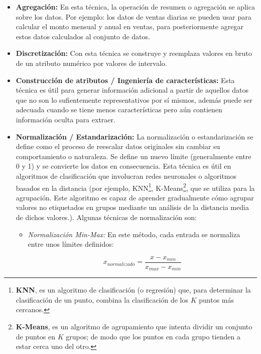 \begin{itemize}
\item \textbf{Agregaci\'{o}n: }En esta t\'{e}cnica, la operaci\'{o}n de resumen o agregaci\'{o}n se aplica sobre los datos. Por ejemplo: los datos de ventas diarias se pueden usar para calcular el monto mensual y anual en ventas, para posteriormente agregar estos datos calculados al conjunto de datos.

\item \textbf{Discretizaci\'{o}n: }Con esta t\'{e}cnica se construye y reemplaza valores en bruto de un atributo num\'{e}rico por valores de intervalo.

\item \textbf{Construcci\'{o}n de atributos / Ingenier\'{i}a de caracter\'{i}sticas: }Esta t\'{e}cnica es \'{u}til para generar informaci\'{o}n adicional a partir de aquellos datos que no son lo sufientemente representativos por s\'{i} mismos, adem\'{a}s puede ser adecuada cuando se tiene menos caracter\'{i}sticas pero a\'{u}n contienen informaci\'{o}n oculta para extraer.

\item \textbf{Normalizaci\'{o}n / Estandarizaci\'{o}n: }La normalizaci\'{o}n o estandarizaci\'{o}n se define como el proceso de reescalar datos originales sin cambiar su comportamiento o naturaleza. Se define un nuevo l\'{i}mite (generalmente entre 0 y 1) y se convierte los datos en consecuencia. Esta t\'{e}cnica es \'{u}til en algoritmos de clasificaci\'{o}n que involucran redes neuronales o algoritmos basados en la distancia (por ejemplo, KNN\footnote{\textbf{KNN}, es un algoritmo de clasificaci\'{o}n (o regresi\'{o}n) que, para determinar la clasificaci\'{o}n de un punto, combina la clasificaci\'{o}n de los $K$ puntos m\'{a}s cercanos.}, K-Means\footnote{\textbf{K-Means}, es un algoritmo de agrupamiento que intenta dividir un conjunto de puntos en $K$ grupos; de modo que los puntos en cada grupo tienden a estar cerca uno del otro.}, que se utiliza para la agrupaci\'{o}n. Este algoritmo es capaz de aprender gradualmente c\'{o}mo agrupar valores no etiquetados en grupos mediante un an\'{a}lisis de la distancia media de dichos valores.). Algunas t\'{e}cnicas de normalizaci\'{o}n son:
\begin{itemize}
\item \textit{Normalizaci\'{o}n Min-Max: }En este m\'{e}todo, cada entrada se normaliza entre unos l\'{i}mites definidos:

\begin{equation}
x_{normalizado} = \frac{x - x_{min}}{x_{max}-x_{min}}
\end{equation}


\end{itemize}
\end{itemize}
